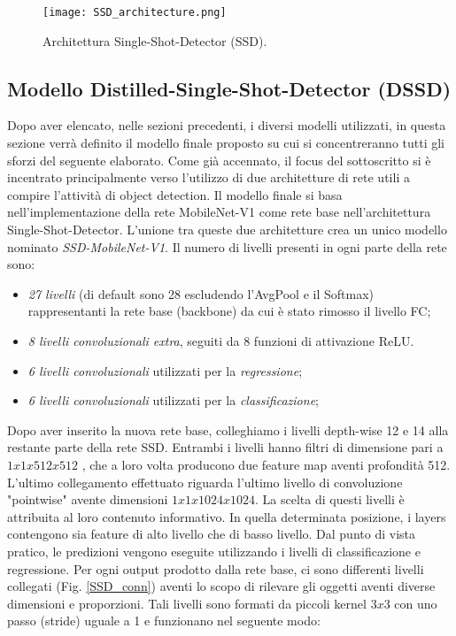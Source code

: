 \begin{figure}
    \centering
    \texttt{[image: SSD\_architecture.png]}
    \centering
    \caption{Architettura Single-Shot-Detector (SSD).}
    \label{SSD_Arch}
\end{figure}

\subsection{Modello Distilled-Single-Shot-Detector (DSSD)}
Dopo aver elencato, nelle sezioni precedenti, i diversi modelli utilizzati, in questa sezione verrà definito il modello finale proposto su cui si concentreranno tutti gli sforzi del seguente elaborato. Come già accennato, il focus del sottoscritto si è incentrato principalmente verso l'utilizzo di due architetture di rete utili a compire l'attività di object detection. Il modello finale si basa nell'implementazione della rete MobileNet-V1 come rete base nell'architettura Single-Shot-Detector. L'unione tra queste due architetture crea un unico modello nominato \emph{SSD-MobileNet-V1}.
Il numero di livelli presenti in ogni parte della rete sono:
\begin{itemize}
    \item \emph{27 livelli} (di default sono 28 escludendo l'AvgPool e il Softmax) rappresentanti la rete base (backbone) da cui è stato rimosso il livello FC;
    \item \emph{8 livelli convoluzionali extra}, seguiti da 8 funzioni di attivazione ReLU.
    \item \emph{6 livelli convoluzionali} utilizzati per la \emph{regressione};
    \item \emph{6 livelli convoluzionali} utilizzati per la \emph{classificazione};
\end{itemize}
Dopo aver inserito la nuova rete base, colleghiamo i livelli depth-wise 12 e 14 alla restante parte della rete SSD. Entrambi i livelli hanno filtri di dimensione pari a $1x1x512x512$ , che a loro volta producono due feature map aventi profondità 512. L'ultimo collegamento effettuato riguarda l'ultimo livello di convoluzione "pointwise" avente dimensioni $1x1x1024x1024$.
La scelta di questi livelli è attribuita al loro contenuto informativo. In quella determinata posizione, i layers contengono sia feature di alto livello che di basso livello. Dal punto di vista pratico, le predizioni vengono eseguite utilizzando i livelli di classificazione e regressione. Per ogni output prodotto dalla rete base, ci sono differenti livelli collegati (Fig. \ref{SSD_conn}) aventi lo scopo di rilevare gli oggetti aventi diverse dimensioni e proporzioni. Tali livelli sono formati da piccoli kernel $3x3$ con uno passo (stride) uguale a 1 e funzionano nel seguente modo:
